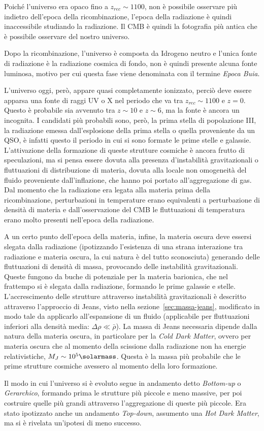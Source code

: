 Poiché l'universo era opaco fino a $z_{rec} \sim 1100$, non è possibile osservare più indietro dell'epoca della ricombinazione, l'epoca della radiazione è quindi inaccessibile studiando la radiazione. Il CMB è quindi la fotografia più antica che è possibile osservare del nostro universo.

Dopo la ricombinazione, l'universo è composta da Idrogeno neutro e l'unica fonte di radiazione è la radiazione cosmica di fondo, non è quindi presente alcuna fonte luminosa, motivo per cui questa fase viene denominata con il termine \textit{Epoca Buia}.

L'universo oggi, però, appare quasi completamente ionizzato, perciò deve essere apparsa una fonte di raggi UV o X nel periodo che va tra $z_{rec} \sim 1100$ e $z = 0$. Questo è probabile sia avvenuto tra $z \sim 10$ e $z \sim 6$, ma la fonte è ancora un incognita. I candidati più probabili sono, però, la prima stella di popolazione III, la radiazione emessa dall'esplosione della prima stella o quella proveniente da un QSO, è infatti questo il periodo in cui si sono formate le prime stelle e galassie. L'attivazione della formazione di queste strutture cosmiche è ancora frutto di speculazioni, ma si pensa essere dovuta alla presenza d'instabilità gravitazionali o fluttuazioni di distribuzione di materia, dovuta alla locale non omogeneità del fluido proveniente dall'inflazione, che hanno poi portato all'aggregazione di gas. Dal momento che la radiazione era legata alla materia prima della ricombinazione, perturbazioni in temperature erano equivalenti a perturbazione di densità di materia e dall'osservazione del CMB le fluttuazioni di temperatura erano molto presenti nell'epoca della radiazione.

A un certo punto dell'epoca della materia, infine, la materia oscura deve essersi slegata dalla radiazione (ipotizzando l'esistenza di una strana interazione tra radiazione e materia oscura, la cui natura è del tutto sconosciuta) generando delle fluttuazioni di densità di massa, provocando delle instabilità gravitazionali. Queste fungono da buche di potenziale per la materia barionica, che nel frattempo si è slegata dalla radiazione, formando le prime galassie e stelle. L'accrescimento delle strutture attraverso instabilità gravitazionali è descritto attraverso l'approccio di Jeans, visto nella sezione~\ref{sec:massa-jeans}, modificato in modo tale da applicarlo all'espansione di un fluido (applicabile per fluttuazioni inferiori alla densità media: $\Delta \rho \ll \bar{\rho}$). La massa di Jeans necessaria dipende dalla natura della materia oscura, in particolare per la \textit{Cold Dark Matter}, ovvero per materia oscura che al momento della scissione dalla radiazione non ha energie relativistiche, $M_J \sim 10^5 \si{\solarmass}$. Questa è la massa più probabile che le prime strutture cosmiche avessero al momento della loro formazione.

Il modo in cui l'universo si è evoluto segue in andamento detto \textit{Bottom-up} o \textit{Gerarchico}, formando prima le strutture più piccole e meno massive, per poi costruire quelle più grandi attraverso l'aggregazione di queste più piccole. Era stato ipotizzato anche un andamento \textit{Top-down}, assumento una \textit{Hot Dark Matter}, ma si è rivelata un'ipotesi di meno successo.
